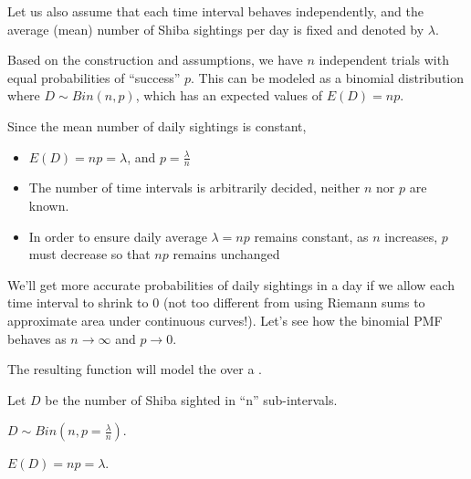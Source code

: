 Let us also assume that each time interval behaves independently, and the average (mean) number of Shiba sightings per day is fixed and denoted by $\lambda$. 

Based on the construction and assumptions, we have $n$ independent trials with equal probabilities of ``success'' $p$. This can be modeled as a binomial distribution where $D \sim Bin(n, p)$, which has an expected values of $E(D) = np$. 

Since the mean number of daily sightings is constant, 

\begin{itemize}
    \item $E(D) = np = \lambda$, and $p = \frac{\lambda}{n}$
    \item The number of time intervals is arbitrarily decided, neither $n$ nor $p$ are known.
    \item In order to ensure daily average $\lambda = np$ remains constant, as $n$ increases, $p$ must decrease so that $np$ remains unchanged
\end{itemize}

We'll get more accurate probabilities of daily sightings in a day if we allow each time interval to shrink to $0$ (not too different from using Riemann sums to approximate area under continuous curves!). Let's see how the binomial PMF behaves as $n \to \infty$ and $p \to 0$.

The resulting function will model the  over a .

Let $D$ be the number of Shiba sighted in ``n'' sub-intervals.

$D \sim Bin(n, p = \frac{\lambda}{n})$. 

$E(D) = np = \lambda$. 

